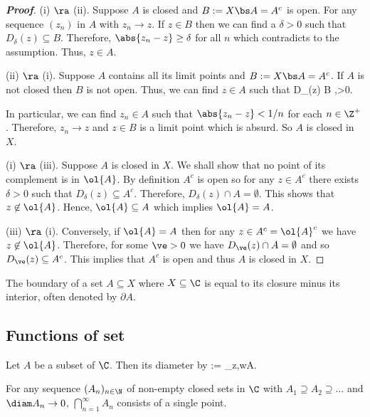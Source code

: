 \begin{proof}[\bf Proof]
(i) $\ra$ (ii). Suppose $A$ is closed and $B:= X\bs A = A^c$ is open. For any sequence $(z_n)$ in $A$ with $z_n \to z$. If $z\in B$ then we can find a $\delta>0$ such that $D_\delta(z) \subseteq B$. Therefore, $\abs{z_n - z} \geq \delta$ for all $n$ which contradicts to the assumption. Thus, $z\in A$.

(ii) $\ra$ (i). Suppose $A$ contains all its limit points and $B:= X \bs A = A^c$. If $A$ is not closed then $B$ is not open. Thus, we can find $z\in A$ such that
\be
D_\delta(z) \cap B \neq \emptyset,\qquad {}\delta >0.
\ee

In particular, we can find $z_n \in A$ such that $\abs{z_n - z} < 1/n$ for each $n\in \Z^+$. Therefore, $z_n \to z$ and $z\in B$ is a limit point which is absurd. So $A$ is closed in $X$.

(i) $\ra$ (iii). Suppose $A$ is closed in $X$. We shall show that no point of its complement is in $\ol{A}$. By definition $A^c$ is open so for any $z\in A^c$ there exists $\delta >0$ such that $D_\delta(z) \subseteq A^c$. Therefore, $D_\delta(z) \cap A = \emptyset$. This shows that $z\not\in \ol{A}$. Hence, $\ol{A} \subseteq A$ which implies $\ol{A} = A$.

(iii) $\ra$ (i). Conversely, if $\ol{A} = A$ then for any $z\in A^c = \ol{A}^c$ we have $z\not\in \ol{A}$. Therefore, for some $\ve>0$ we have $D_\ve(z)\cap A = \emptyset$ and so $D_\ve(z)\subseteq A^c$. This implies that $A^c$ is open and thus $A$ is closed in $X$.
\end{proof}


\begin{definition}[boundary]
The boundary of a set $A\subseteq X$ where $X\subseteq \C$ is equal to its closure minus its interior, often denoted by $\partial A$.
\end{definition}




\subsection{Functions of set}

\begin{definition}[diameter]
Let $A$ be a subset of $\C$. Then its diameter by
\be
\diam{} := \sup_{z,w\in A}.
\ee
\end{definition}


\begin{theorem}\label{thm:cantor_theorem_complex_version}
For any sequence $(A_n)_{n\in \N}$ of non-empty closed sets in $\C$ with $A_1 \supseteq A_2 \supseteq \dots $ and $\diam A_n \to 0$, $\bigcap^\infty_{n=1}A_n$ consists of a single point.
\end{theorem}

